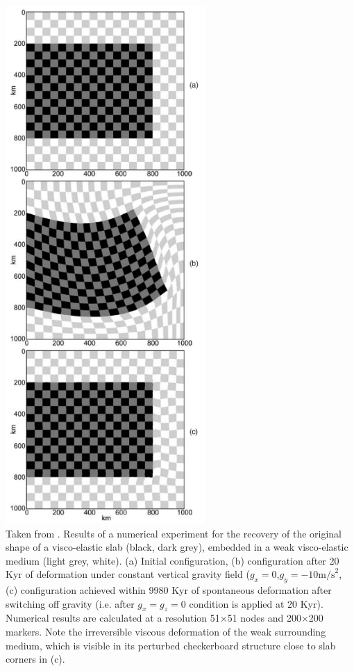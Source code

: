 \begin{center}
\includegraphics[width=7.6cm]{python_codes/fieldstone_64/images/slabgery10}\\
{\captionfont Taken from \cite[16.11]{gery10}. 
Results of a numerical experiment for the recovery of the original
shape of a visco-elastic slab (black, dark grey), 
 embedded in a weak visco-elastic medium (light grey, white). 
(a) Initial configuration, (b) configuration after 20 Kyr of deformation under 
constant vertical gravity field ($g_x=0$,$g_y =-10\text{m/s}^2$, 
(c) configuration achieved within 9980 Kyr of spontaneous deformation after 
switching off gravity (i.e. after $g_x=g_z=0$ condition is applied at
20 Kyr). Numerical results are calculated at a resolution 51$\times$51 nodes and
200$\times$200 markers. Note the irreversible viscous deformation of the weak surrounding medium,
which is visible in its perturbed checkerboard structure close to slab corners in (c).}
\end{center}

